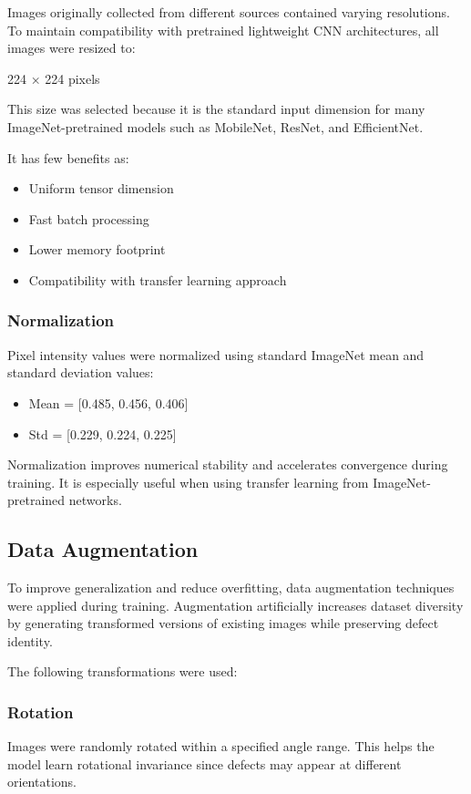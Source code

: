 Images originally collected from different sources contained varying resolutions. To maintain compatibility with pretrained lightweight CNN architectures, all images were resized to:

224 × 224 pixels

This size was selected because it is the standard input dimension for many ImageNet-pretrained models such as MobileNet, ResNet, and EfficientNet.

It has few benefits as:
\begin{itemize}
\item Uniform tensor dimension
\item Fast batch processing
\item Lower memory footprint
\item Compatibility with transfer learning approach
\end{itemize}

\subsubsection {Normalization}

Pixel intensity values were normalized using standard ImageNet mean and standard deviation values:
\begin{itemize}
\item Mean = [0.485, 0.456, 0.406]
\item Std = [0.229, 0.224, 0.225]
\end{itemize}
Normalization improves numerical stability and accelerates convergence during training. It is especially useful when using transfer learning from ImageNet-pretrained networks.

\subsection{Data Augmentation}

To improve generalization and reduce overfitting, data augmentation techniques were applied during training. Augmentation artificially increases dataset diversity by generating transformed versions of existing images while preserving defect identity.

The following transformations were used:

 \subsubsection{Rotation}

Images were randomly rotated within a specified angle range. This helps the model learn rotational invariance since defects may appear at different orientations.

